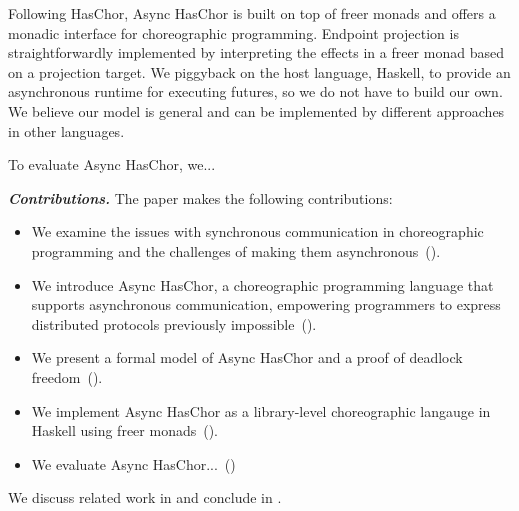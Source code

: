 Following HasChor, Async HasChor is built on top of freer monads and offers a monadic interface for choreographic programming.
%
Endpoint projection is straightforwardly implemented by interpreting the effects in a freer monad based on a projection target.
%
We piggyback on the host language, Haskell, to provide an asynchronous runtime for executing futures, so we do not have to build our own.
%
We believe our model is general and can be implemented by different approaches in other languages.

To evaluate Async HasChor, we...

\vspace{0.5cm}
\noindent \textit{\textbf{Contributions.}} The paper makes the following contributions:
%
\begin{itemize}
\item
    We examine the issues with synchronous communication in choreographic programming and the challenges of making them asynchronous~().
\item
    We introduce Async HasChor, a choreographic programming language that supports asynchronous communication, empowering programmers to express distributed protocols previously impossible~().
\item
    We present a formal model of Async HasChor and a proof of deadlock freedom~().
\item
    We implement Async HasChor as a library-level choreographic langauge in Haskell using freer monads~().
\item
    We evaluate Async HasChor...~()
\end{itemize}
%
We discuss related work in  and conclude in .
